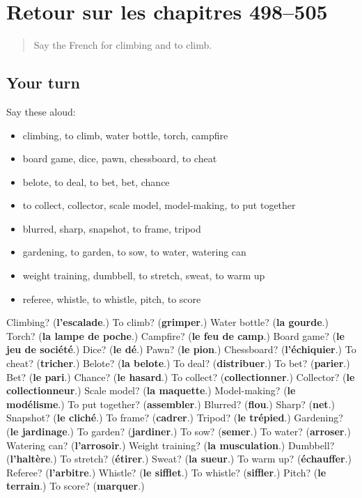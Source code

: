 \section[(dialogue)]{Retour sur les chapitres 498–505}

\label{lesson:FR-R505-revision-498-505}



\begin{quote}
Say the French for climbing and to climb.
\end{quote}

\subsection*{Your turn}
Say these aloud:

\begin{itemize}
\raggedright
  \item climbing, to climb, water bottle, torch, campfire
  \item board game, dice, pawn, chessboard, to cheat
  \item belote, to deal, to bet, bet, chance
  \item to collect, collector, scale model, model-making, to put together
  \item blurred, sharp, snapshot, to frame, tripod
  \item gardening, to garden, to sow, to water, watering can
  \item weight training, dumbbell, to stretch, sweat, to warm up
  \item referee, whistle, to whistle, pitch, to score
\end{itemize}

\begin{tcolorbox}[breakable,colback=teal!4,colframe=teal!35!black,title={Before you move on}]
Climbing? (\textbf{l'escalade}.) To climb? (\textbf{grimper}.) Water bottle? (\textbf{la gourde}.) Torch? (\textbf{la lampe de poche}.) Campfire? (\textbf{le feu de camp}.) Board game? (\textbf{le jeu de société}.) Dice? (\textbf{le dé}.) Pawn? (\textbf{le pion}.) Chessboard? (\textbf{l'échiquier}.) To cheat? (\textbf{tricher}.) Belote? (\textbf{la belote}.) To deal? (\textbf{distribuer}.) To bet? (\textbf{parier}.) Bet? (\textbf{le pari}.) Chance? (\textbf{le hasard}.) To collect? (\textbf{collectionner}.) Collector? (\textbf{le collectionneur}.) Scale model? (\textbf{la maquette}.) Model-making? (\textbf{le modélisme}.) To put together? (\textbf{assembler}.) Blurred? (\textbf{flou}.) Sharp? (\textbf{net}.) Snapshot? (\textbf{le cliché}.) To frame? (\textbf{cadrer}.) Tripod? (\textbf{le trépied}.) Gardening? (\textbf{le jardinage}.) To garden? (\textbf{jardiner}.) To sow? (\textbf{semer}.) To water? (\textbf{arroser}.) Watering can? (\textbf{l'arrosoir}.) Weight training? (\textbf{la musculation}.) Dumbbell? (\textbf{l'haltère}.) To stretch? (\textbf{étirer}.) Sweat? (\textbf{la sueur}.) To warm up? (\textbf{échauffer}.) Referee? (\textbf{l'arbitre}.) Whistle? (\textbf{le sifflet}.) To whistle? (\textbf{siffler}.) Pitch? (\textbf{le terrain}.) To score? (\textbf{marquer}.)
\end{tcolorbox}
